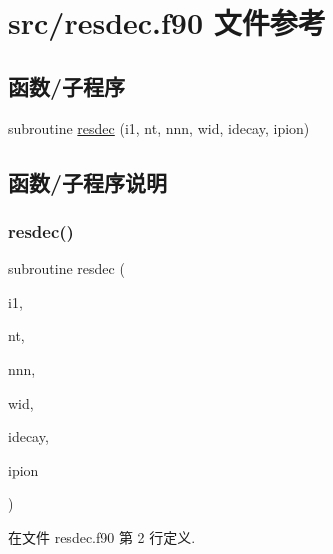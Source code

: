 \hypertarget{resdec_8f90}{}\section{src/resdec.f90 文件参考}
\label{resdec_8f90}
\subsection*{函数/子程序}
\begin{DoxyCompactItemize}
\item 
subroutine \mbox{\hyperlink{resdec_8f90_a04fe6ad47820be669e3d14f5c1b78693}{resdec}} (i1, nt, nnn, wid, idecay, ipion)
\end{DoxyCompactItemize}


\subsection{函数/子程序说明}
\mbox{\label{resdec_8f90_a04fe6ad47820be669e3d14f5c1b78693}} 
\subsubsection{\texorpdfstring{resdec()}{resdec()}}
{\footnotesize\ttfamily subroutine resdec (\begin{DoxyParamCaption}\item[{}]{i1,  }\item[{}]{nt,  }\item[{}]{nnn,  }\item[{}]{wid,  }\item[{}]{idecay,  }\item[{}]{ipion }\end{DoxyParamCaption})}



在文件 resdec.\+f90 第 2 行定义.

